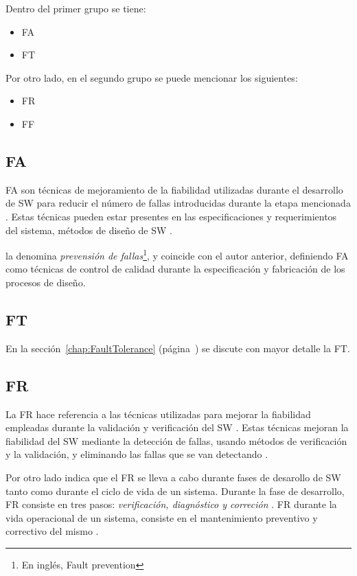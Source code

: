 Dentro del primer grupo se tiene:
\begin{itemize}
 \item \acl{FA}
 \item \acl{FT}
\end{itemize}

Por otro lado, en el segundo grupo se puede mencionar los siguientes:
\begin{itemize}
 \item \acl{FR}
 \item \acl{FF}
\end{itemize}

\subsection{\acl{FA}}
\ac{FA} son técnicas de mejoramiento de la fiabilidad utilizadas durante el desarrollo de \ac{SW}
para reducir el número de fallas introducidas durante la etapa mencionada \citep{Pullum01}. Estas
técnicas pueden estar presentes en las especificaciones y requerimientos del sistema, métodos de
diseño de \ac{SW} \citep{Pullum01}.

\cite{FTDesign} la denomina \textit{prevensión de fallas}\footnote{En inglés, Fault prevention}, y
coincide con el autor anterior, definiendo \ac{FA} como técnicas de control de calidad durante la
especificación y fabricación de los procesos de diseño.


\subsection{\acl{FT}}
En la sección~\ref{chap:FaultTolerance} (página~\pageref{chap:FaultTolerance}) se discute con
mayor detalle la \ac{FT}.

\subsection{\acl{FR}}
La \ac{FR} hace referencia a las técnicas utilizadas para mejorar la fiabilidad empleadas durante
la validación y verificación del \ac{SW} \citep{Pullum01}. Estas técnicas mejoran la fiabilidad del
\ac{SW} mediante la detección de fallas, usando métodos de verificación y la validación, y
eliminando las fallas que se van detectando \citep{Pullum01}.

Por otro lado \cite{FTDesign} indica que el \ac{FR} se lleva a cabo durante fases de desarollo de
\ac{SW} tanto como durante el ciclo de vida de un sistema. Durante la fase de desarrollo, \ac{FR}
consiste en tres pasos: \textit{verificación, diagnóstico y correción} \citep{FTDesign}. \ac{FR}
durante la vida operacional de un sistema, consiste en el mantenimiento preventivo y correctivo del
mismo \citep{FTDesign}.


